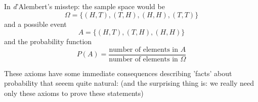 \documentclass[twoside,11pt,a4paper]{article}
\newif\ifEN \ENtrue	                %
\def\tr|#1|#2|{\ifEN #2\else #1\fi}     %
\theoremstyle{definition}
\newcounter{exc}
\begin{document}
\begin{example}
  \tr|In \emph{d'Alemberts Fehler} wäre die Ergebnismenge
  |In  \emph{d'Alembert's misstep:} the sample space would be |
  $$
  \Omega=\{(H,T), (T,H), (H,H), (T,T)\}
  $$
  \tr|und ein mögliches Ereignis |and a possible event |
  $$
  A=\{(H,T), (T,H), (H,H)\}
  $$
  \tr|und die Wahrscheinlichkeitsfunktion |and the probability function |
  $$
  P(A)=\frac{\text{\tr|Anzahl Elemente von|number of elements in| $A$}}{\text{\tr|Anzahl Elemente von |number of elements in| $\Omega$}}
  $$
\end{example}
\par 

\tr|Diese Axiome haben einige unmittelbare Konsequenzen, die Eigenschaften von \emph{Wahrscheinlichkeit}, die ganz natürlich erscheinen:
(und das überraschende ist, dass wir wirklich nur diese Axiome brauchen, um sie zu beweisen.)
|These axioms have some immediate consequences describing 'facts' about probability that seeem quite natural: 
(and the surprising thing is: we really need only these axioms to prove these statements)|
\end{document}
